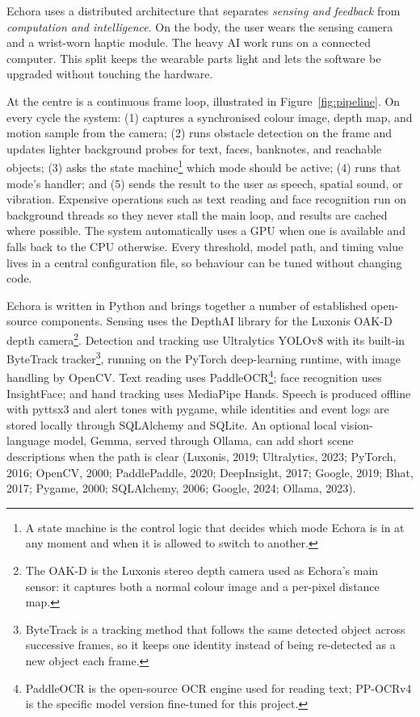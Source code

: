 Echora uses a distributed architecture that separates \emph{sensing and feedback} from \emph{computation and intelligence}. On the body, the user wears the sensing camera and a wrist-worn haptic module. The heavy AI work runs on a connected computer. This split keeps the wearable parts light and lets the software be upgraded without touching the hardware.

At the centre is a continuous frame loop, illustrated in Figure~\ref{fig:pipeline}. On every cycle the system: (1) captures a synchronised colour image, depth map, and motion sample from the camera; (2) runs obstacle detection on the frame and updates lighter background probes for text, faces, banknotes, and reachable objects; (3) asks the state machine\footnote{A state machine is the control logic that decides which mode Echora is in at any moment and when it is allowed to switch to another.} which mode should be active; (4) runs that mode's handler; and (5) sends the result to the user as speech, spatial sound, or vibration. Expensive operations such as text reading and face recognition run on background threads so they never stall the main loop, and results are cached where possible. The system automatically uses a GPU when one is available and falls back to the CPU otherwise. Every threshold, model path, and timing value lives in a central configuration file, so behaviour can be tuned without changing code.

Echora is written in Python and brings together a number of established open-source components. Sensing uses the DepthAI library for the Luxonis OAK-D depth camera\footnote{The OAK-D is the Luxonis stereo depth camera used as Echora's main sensor: it captures both a normal colour image and a per-pixel distance map.}. Detection and tracking use Ultralytics YOLOv8 with its built-in ByteTrack tracker\footnote{ByteTrack is a tracking method that follows the same detected object across successive frames, so it keeps one identity instead of being re-detected as a new object each frame.}, running on the PyTorch deep-learning runtime, with image handling by OpenCV. Text reading uses PaddleOCR\footnote{PaddleOCR is the open-source OCR engine used for reading text; PP-OCRv4 is the specific model version fine-tuned for this project.}; face recognition uses InsightFace; and hand tracking uses MediaPipe Hands. Speech is produced offline with pyttsx3 and alert tones with pygame, while identities and event logs are stored locally through SQLAlchemy and SQLite. An optional local vision-language model, Gemma, served through Ollama, can add short scene descriptions when the path is clear (Luxonis, 2019; Ultralytics, 2023; PyTorch, 2016; OpenCV, 2000; PaddlePaddle, 2020; DeepInsight, 2017; Google, 2019; Bhat, 2017; Pygame, 2000; SQLAlchemy, 2006; Google, 2024; Ollama, 2023).

